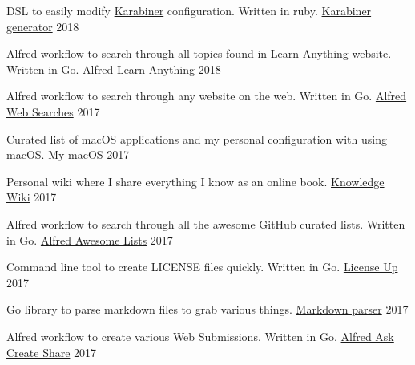 
\begin{cventries}

  \cventry
    {DSL to easily modify \href{https://github.com/tekezo/Karabiner-Elements}{Karabiner} configuration. Written in ruby.}
    {\href{https://github.com/nikitavoloboev/karabiner-generator\#readme}{Karabiner generator}}
    {}
    {2018}
    {
    }

  \cventry
    {Alfred workflow to search through all topics found in Learn Anything website. Written in Go.}
    {\href{https://github.com/nikitavoloboev/alfred-learn-anything\#readme}{Alfred Learn Anything}}
    {}
    {2018}
    {
    }

    \cventry
    {Alfred workflow to search through any website on the web. Written in Go.}
    {\href{https://github.com/nikitavoloboev/alfred-web-searches\#readme}{Alfred Web Searches}}
    {}
    {2017}
    {
    }

    \cventry
    {Curated list of macOS applications and my personal configuration with using macOS.}
    {\href{https://github.com/nikitavoloboev/my-mac-os\#readme}{My macOS}}
    {}
    {2017}
    {
    }

    \cventry
    {Personal wiki where I share everything I know as an online book.}
    {\href{https://wiki.nikitavoloboev.xyz\#readme}{Knowledge Wiki}}
    {}
    {2017}
    {
    }

    \cventry
    {Alfred workflow to search through all the awesome GitHub curated lists. Written in Go.}
    {\href{https://github.com/nikitavoloboev/alfred-awesome-lists\#readme}{Alfred Awesome Lists}}
    {}
    {2017}
    {
    }

    \cventry
    {Command line tool to create LICENSE files quickly. Written in Go.}
    {\href{https://github.com/nikitavoloboev/license-up\#readme}{License Up}}
    {}
    {2017}
    {
    }

    \cventry
    {Go library to parse markdown files to grab various things.}
    {\href{https://github.com/nikitavoloboev/markdown-parser\#readme}{Markdown parser}}
    {}
    {2017}
    {
    }

    \cventry
    {Alfred workflow to create various Web Submissions. Written in Go.}
    {\href{https://github.com/nikitavoloboev/alfred-ask-create-share\#readme}{Alfred Ask Create Share}}
    {}
    {2017}
    {
    }

\end{cventries}
